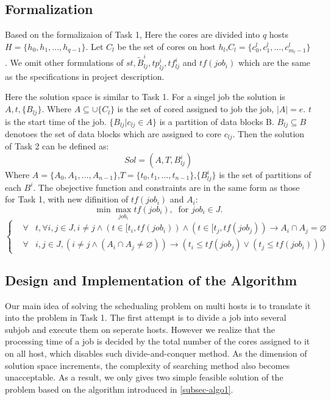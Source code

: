 \documentclass{llncs}
\begin{document}
\subsection{Formalization}\label{subsec-form2}
Based on the formalizaion of Task 1, Here the cores are divided into $q$ hosts $H = \{h_0,h_1,\dots,h_{q-1}\}$. Let $C_l$ be the set of cores on host $h_l$,$C_l = \{c_0^l,c_1^l,\dots,c^l_{m_l-1}\}$. We omit other formulations of $st, \widetilde{B}^i_{lj},tp^i_{lj}, tf^i_{lj}$ and $tf(job_i)$ which are the same as the specifications in project description.

Here the solution space is similar to Task 1. For a singel job the solution is $A,t,\{B_{lj}\}$. Where $A \subseteq \cup \{C_l\}$ is the set of cored assigned to job the job, $|A| = e$. $t$ is the start time of the job. $\{B_{lj}|c_{lj} \in A\}$ is a partition of data blocks B. $B_{lj} \subseteq B$ denotoes the set of data blocks which are assigned to core $c_{lj}$. Then the solution of Task 2 can be defined as:\\
\begin{equation*}
  Sol = (A,T,{B^i_{lj}})
\end{equation*}
Where $A = \{A_0,A_1,\dots,A_{n-1}\}$,$T=\{t_0,t_1,\dots,t_{n-1}\}$,$\{B^i_{lj}\}$ is the set of partitions of each $B^i$. The obejective function and constraints are in the same form as those for Task 1, with new difinition of $tf(job_i)$ and $A_i$:\\
  \begin{equation*}
  \min \max_{job_i} tf(job_i), \ \text{ for } job_i \in J.
  \end{equation*}
\begin{equation} \label{constraints-job0}
\left\{
\begin{array}{ccl}
 &\forall &t, \forall i, j \in J, i \neq j \land (t \in [t_i,tf(job_i)) \land (t \in [t_j,tf(job_j))
 \rightarrow A_i \cap A_j = \varnothing \\
 &\forall &i, j \in J, (i \neq j \land (A_i \cap A_j \neq \varnothing)) \rightarrow (t_i \leq tf(job_j) \lor (t_j \leq tf(job_i)))
\end{array}
\right.
\end{equation}
\subsection{Design and Implementation of the Algorithm}\label{subsec-algo2}
   Our main idea of solving the schedualing problem on multi hosts is to translate it into the problem in Task 1. The first attempt is to divide a job into several subjob and execute them on seperate hosts. However we realize that the processing time of a job is decided by the total number of the cores assigned to it on all host, which disables such divide-and-conquer method. As the dimension of solution space increments, the complexity of searching method also becomes unacceptable. As a result, we only gives two simple feasible solution of the problem based on the algorithm introduced in \ref{subsec-algo1}.
\end{document}
